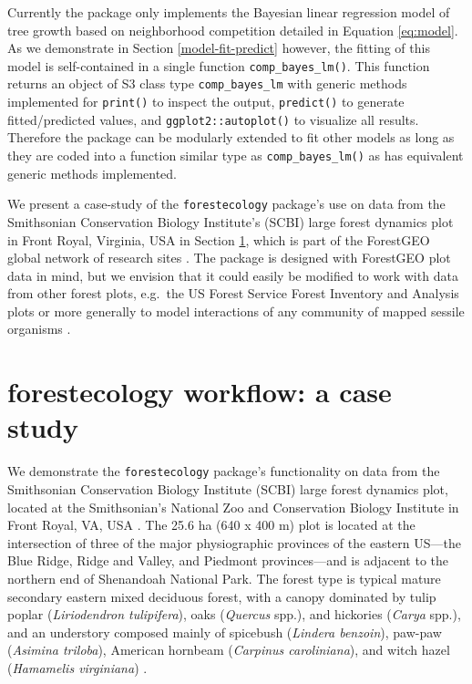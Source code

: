 \documentclass[12pt]{article}
\begin{document}
Currently the package only implements the Bayesian linear regression
model of tree growth based on neighborhood competition detailed in
Equation \ref{eq:model}. As we demonstrate in Section
\ref{model-fit-predict} however, the fitting of this model is
self-contained in a single function \texttt{comp\_bayes\_lm()}. This
function returns an object of S3 class type \texttt{comp\_bayes\_lm}
with generic methods implemented for \texttt{print()} to inspect the
output, \texttt{predict()} to generate fitted/predicted values, and
\texttt{ggplot2::autoplot()} to visualize all results. Therefore the
package can be modularly extended to fit other models as long as they
are coded into a function similar type as \texttt{comp\_bayes\_lm()} as
has equivalent generic methods implemented.

We present a case-study of the \texttt{forestecology} package's use on
data from the Smithsonian Conservation Biology Institute's (SCBI) large
forest dynamics plot in Front Royal, Virginia, USA in Section
\ref{casestudy}, which is part of the ForestGEO global network of
research sites
\citep[\citet{andersonteixeira_ctfs-forestgeo_2015}]{bourg_initial_2013}.
The package is designed with ForestGEO plot data in mind, but we
envision that it could easily be modified to work with data from other
forest plots, e.g.~the US Forest Service Forest Inventory and Analysis
plots or more generally to model interactions of any community of mapped
sessile organisms \citep{smith_forest_2002}.

\hypertarget{casestudy}{%
\section{forestecology workflow: a case study}\label{casestudy}}

We demonstrate the \texttt{forestecology} package's functionality on
data from the Smithsonian Conservation Biology Institute (SCBI) large
forest dynamics plot, located at the Smithsonian's National Zoo and
Conservation Biology Institute in Front Royal, VA, USA
\citep{bourg_initial_2013}. The 25.6 ha (640 x 400 m) plot is located at
the intersection of three of the major physiographic provinces of the
eastern US---the Blue Ridge, Ridge and Valley, and Piedmont
provinces---and is adjacent to the northern end of Shenandoah National
Park. The forest type is typical mature secondary eastern mixed
deciduous forest, with a canopy dominated by tulip poplar
(\emph{Liriodendron tulipifera}), oaks (\emph{Quercus} spp.), and
hickories (\emph{Carya} spp.), and an understory composed mainly of
spicebush (\emph{Lindera benzoin}), paw-paw (\emph{Asimina triloba}),
American hornbeam (\emph{Carpinus caroliniana}), and witch hazel
(\emph{Hamamelis virginiana}) \citep{bourg_initial_2013}.
\end{document}
